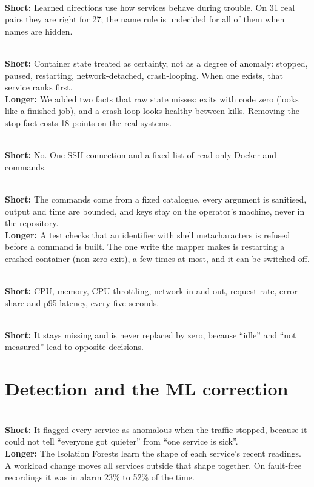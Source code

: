 \\
\textbf{Short:} Learned directions use how services behave during trouble. On 31 real pairs they are right for 27; the name rule is undecided for all of them when names are hidden.

\\
\textbf{Short:} Container state treated as certainty, not as a degree of anomaly: stopped, paused, restarting, network-detached, crash-looping. When one exists, that service ranks first.\\
\textbf{Longer:} We added two facts that raw state misses:  exits with code zero (looks like a finished job), and a crash loop looks healthy between kills. Removing the stop-fact costs 18 points on the real systems.

\\
\textbf{Short:} No. One SSH connection and a fixed list of read-only Docker and  commands.

\\
\textbf{Short:} The commands come from a fixed catalogue, every argument is sanitised, output and time are bounded, and keys stay on the operator's machine, never in the repository.\\
\textbf{Longer:} A test checks that an identifier with shell metacharacters is refused before a command is built. The one write the mapper makes is restarting a crashed container (non-zero exit), a few times at most, and it can be switched off.

\\
\textbf{Short:} CPU, memory, CPU throttling, network in and out, request rate, error share and p95 latency, every five seconds.

\\
\textbf{Short:} It stays missing and is never replaced by zero, because ``idle'' and ``not measured'' lead to opposite decisions.

\section{Detection and the ML correction}

\\
\textbf{Short:} It flagged every service as anomalous when the traffic stopped, because it could not tell ``everyone got quieter'' from ``one service is sick''.\\
\textbf{Longer:} The Isolation Forests learn the shape of each service's recent readings. A workload change moves all services outside that shape together. On fault-free recordings it was in alarm 23\% to 52\% of the time.

